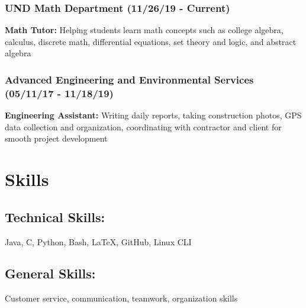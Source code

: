 \documentclass{article}
\begin{document}
\subsubsection{UND Math Department (11/26/19 - Current)}
\textbf{Math Tutor:} Helping students learn math concepts such as college algebra, calculus, discrete math, differential equations, set theory and logic, and abstract algebra

\subsubsection{Advanced Engineering and Environmental Services (05/11/17 - 11/18/19)}
\textbf{Engineering Assistant:} Writing daily reports, taking construction photos, GPS data collection and organization, coordinating with contractor and client for smooth project development

\section{Skills}

\subsection{Technical Skills:}
Java, C, Python, Bash, {\LaTeX}, GitHub, Linux CLI

\subsection{General Skills:}
Customer service, communication, teamwork, organization skills
\end{document}
